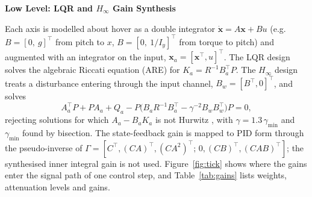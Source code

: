 \documentclass[10pt,letterpaper]{article}
\newif\ifafterheadone
\newcommand{\headingtwo}[1]{\par\ifafterheadone\nopagebreak\else\addpenalty{-200}\fi\vspace{6pt}%
    {\centering\fontsize{12}{14}\selectfont\bfseries #1\par}%
    \nopagebreak\vspace{2pt}\nopagebreak\global\afterheadonefalse\noindent\ignorespaces}
\begin{document}
\headingtwo{Low Level: LQR and $H_\infty$ Gain Synthesis}
Each axis is modelled about hover as a double integrator $\dot{\mathbf{x}}=A\mathbf{x}+Bu$
(e.g.\ $B=[0,\ g]^\top$ from pitch to $x$, $B=[0,\ 1/I_y]^\top$ from torque to pitch) and
augmented with an integrator on the input, $\mathbf{x}_a=[\mathbf{x}^\top,u]^\top$. The LQR
design solves the algebraic Riccati equation (ARE) for $K_a=R^{-1}B_a^\top P$. The $H_\infty$
design treats a disturbance entering through the input channel, $B_w=[B^\top,0]^\top$, and
solves
\begin{equation}
    A_a^\top P+PA_a+Q_a-P\bigl(B_aR^{-1}B_a^\top-\gamma^{-2}B_wB_w^\top\bigr)P=0,
    \label{eq:hare}
\end{equation}
rejecting solutions for which $A_a-B_aK_a$ is not Hurwitz \cite{doyleStateSpaceHinf1989}, with
$\gamma=1.3\,\gamma_{\min}$ and $\gamma_{\min}$ found by bisection. The state-feedback gain is
mapped to PID form through the pseudo-inverse of
$\Gamma=[C^\top,(CA)^\top,(CA^2)^\top;\,0,(CB)^\top,(CAB)^\top]$; the synthesised inner integral
gain is not used. Figure~\ref{fig:tick} shows where the gains enter the signal path of one control
step, and Table~\ref{tab:gains} lists weights, attenuation levels and gains.
\end{document}
